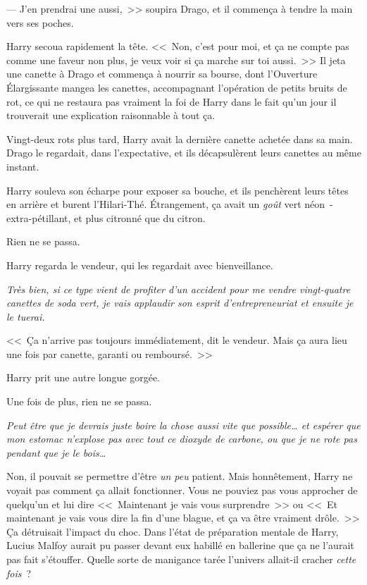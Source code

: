 --- J'en prendrai une aussi,~>> soupira Drago, et il commença à tendre la main vers ses poches.

Harry secoua rapidement la tête. <<~Non, c'est pour moi, et ça ne compte pas comme une faveur non plus, je veux voir si ça marche sur toi aussi.~>> Il jeta une canette à Drago et commença à nourrir sa bourse, dont l'Ouverture Élargissante mangea les canettes, accompagnant l'opération de petits bruits de rot, ce qui ne restaura pas vraiment la foi de Harry dans le fait qu'un jour il trouverait une explication raisonnable à tout ça.

Vingt-deux rots plus tard, Harry avait la dernière canette achetée dans sa main. Drago le regardait, dans l'expectative, et ils décapsulèrent leurs canettes au même instant.

Harry souleva son écharpe pour exposer sa bouche, et ils penchèrent leurs têtes en arrière et burent l'Hilari-Thé. Étrangement, ça avait un \emph{goût} vert néon~- extra-pétillant, et plus citronné que du citron.

Rien ne se passa.

Harry regarda le vendeur, qui les regardait avec bienveillance.

\emph{Très bien, si ce type vient de profiter d'un accident pour me vendre vingt-quatre canettes de soda vert, je vais applaudir son esprit d'entrepreneuriat et ensuite je le tuerai.}

<<~Ça n'arrive pas toujours immédiatement, dit le vendeur. Mais ça aura lieu une fois par canette, garanti ou remboursé.~>>

Harry prit une autre longue gorgée.

Une fois de plus, rien ne se passa.

\emph{Peut être que je devrais juste boire la chose aussi vite que possible… et espérer que mon estomac n'explose pas avec tout ce dioxyde de carbone, ou que je ne rote pas pendant que je le bois…}

Non, il pouvait se permettre d'être \emph{un peu} patient. Mais honnêtement, Harry ne voyait pas comment ça allait fonctionner. Vous ne pouviez pas vous approcher de quelqu'un et lui dire <<~Maintenant je vais vous surprendre~>> ou <<~Et maintenant je vais vous dire la fin d'une blague, et ça va être vraiment drôle.~>> Ça détruisait l'impact du choc. Dans l'état de préparation mentale de Harry, Lucius Malfoy aurait pu passer devant eux habillé en ballerine que ça ne l'aurait pas fait s'étouffer. Quelle sorte de manigance tarée l'univers allait-il cracher \emph{cette fois}~?

